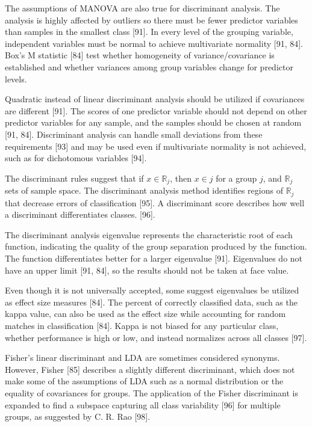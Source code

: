 \documentclass[sn-mathphys-num]{sn-jnl}%
\begin{document}
The assumptions of MANOVA are also true for discriminant analysis. The analysis is highly affected by outliers so there must be fewer predictor variables than samples in the smallest class [91]. In every level of the grouping variable, independent variables must be normal to achieve multivariate normality [91, 84]. Box's M statistic [84] test whether homogeneity of variance/covariance is established and whether variances among group variables change for predictor levels. 

Quadratic instead of linear discriminant analysis should be utilized if covariances are different [91]. The scores of one predictor variable should not depend on other predictor variables for any sample, and the samples should be chosen at random [91, 84]. Discriminant analysis can handle small deviations from these requirements [93] and may be used even if multivariate normality is not achieved, such as for dichotomous variables [94].

The discriminant rules suggest that if $x\in \mathbb{R}_{j}$, then $x\in j$ for a group $j$, and $\mathbb{R}_{j}$ sets of sample space. The discriminant analysis method identifies regions of $\mathbb{R}_{j}$ that decrease errors of classification [95]. A discriminant score describes how well a discriminant differentiates classes. [96].
 
The discriminant analysis eigenvalue represents the characteristic root of each function, indicating the quality of the group separation produced by the function. The function differentiates better for a larger eigenvalue [91]. Eigenvalues do not have an upper limit [91, 84], so the results should not be taken at face value.

Even though it is not universally accepted, some suggest eigenvalues be utilized as effect size measures [84]. The percent of correctly classified data, such as the kappa value, can also be used as the effect size while accounting for random matches in classification [84]. Kappa is not biased for any particular class, whether performance is high or low, and instead normalizes across all classes [97]. 

Fisher's linear discriminant and LDA are sometimes considered synonyms. However, Fisher [85] describes a slightly different discriminant, which does not make some of the assumptions of LDA such as a normal distribution or the equality of covariances for groups. The application of the Fisher discriminant is expanded to find a subspace capturing all class variability [96] for multiple groups, as suggested by C. R. Rao [98].
\end{document}
